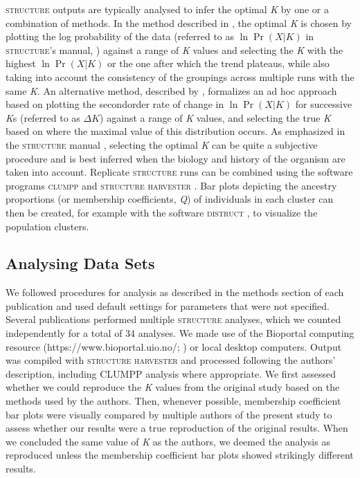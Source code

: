 \textsc{structure} outputs are typically analysed to infer the optimal \emph{K} by one 
or a combination of methods. In the method described in \citet{Pritchard:2000}, the 
optimal \emph{K} is chosen by plotting the log probability of the data (referred to as 
$\ln \Pr(X|K)$ in \textsc{structure}'s manual, \citealt{Pritchard:2007}) against a range of \emph{K} 
values and selecting the \emph{K} with the highest $\ln \Pr(X|K)$ or the one after which the 
trend plateaus, while also taking into account the consistency of the groupings across 
multiple runs with the same \emph{K}. An alternative method, described by \citet{Evanno:2005}, 
formalizes an ad hoc approach based on plotting the secondorder rate of change in $\ln \Pr(X|K)$ 
for successive \emph{K}s (referred to as $\Delta K$) against a range of \emph{K} values, and selecting 
the true \emph{K} based on where the maximal value of this distribution occurs. As 
emphasized in the \textsc{structure} manual \citep{Pritchard:2007}, selecting the optimal 
\emph{K} can be quite a subjective procedure and is best inferred when the biology and 
history of the organism are taken into account. Replicate \textsc{structure} runs can be 
combined using the software programs \textsc{clumpp} \citep{Jakobsson:2007} and 
\textsc{structure harvester} \citep{Earl:2012}. Bar plots depicting the ancestry 
proportions (or membership coefficients, \emph{Q}) of individuals in each cluster can then be 
created, for example with the software \textsc{distruct} \citep{Rosenberg:2004}, to visualize the population clusters.

\subsection{Analysing Data Sets}
We followed procedures for analysis as described in the methods section of each publication 
and used default settings for parameters that were not specified. Several publications 
performed multiple \textsc{structure} analyses, which we counted independently for a total 
of 34 analyses. We made use of the Bioportal computing resource (https://www.bioportal.uio.no/; \citealt{Kumar:2009}) 
or local desktop computers. Output was compiled with \textsc{structure harvester} and processed 
following the authors' description, including CLUMPP analysis where appropriate. We first assessed 
whether we could reproduce the \emph{K} values from the original study based on the methods used by 
the authors. Then, whenever possible, membership coefficient bar plots were visually compared by 
multiple authors of the present study to assess whether our results were a true reproduction of 
the original results. When we concluded the same value of \emph{K} as the authors, we deemed the 
analysis as reproduced unless the membership coefficient bar plots showed strikingly different results.

